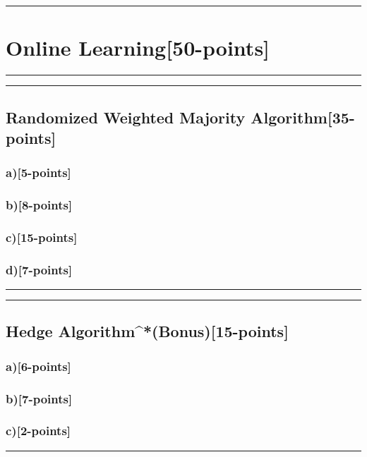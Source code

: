 \documentclass[12pt]{article}
\begin{document}
\newpage
\noindent\rule{\textwidth}{1.5pt}
\section{Online Learning[50-points]}
\noindent\rule{\textwidth}{1.5pt}
\noindent\rule{\textwidth}{0.2pt}
\subsection{Randomized Weighted Majority Algorithm[35-points]}
\subsubsection{a)[5-points]}

\subsubsection{b)[8-points]}
\subsubsection{c)[15-points]}
\subsubsection{d)[7-points]}
\noindent\rule{\textwidth}{0.2pt}
\noindent\rule{\textwidth}{0.2pt}
\subsection{Hedge Algorithm^*(Bonus)[15-points]}
\subsubsection{a)[6-points]}
\subsubsection{b)[7-points]}
\subsubsection{c)[2-points]}

\noindent\rule{\textwidth}{0.4pt}






\end{document}
